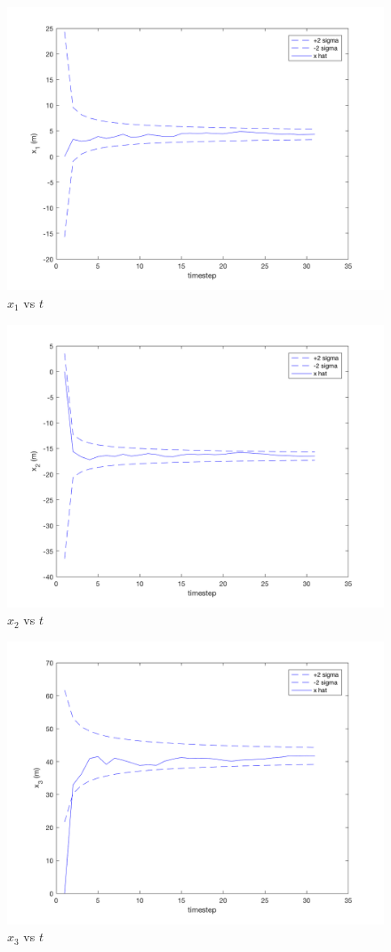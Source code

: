 \documentclass[11pt]{article}
\begin{document}
\subparagraph*{}
\begin{figure}[h!]
	\centering
	\includegraphics[width=0.8\linewidth]{p4_plot1.png}
	\caption{$x_1$ vs $t$}
	\label{p4_plot1}
\end{figure}
\begin{figure}[h!]
	\centering
	\includegraphics[width=0.8\linewidth]{p4_plot2.png}
	\caption{$x_2$ vs $t$}
	\label{p4_plot2}
\end{figure}
\begin{figure}[h!]
	\centering
	\includegraphics[width=0.8\linewidth]{p4_plot3.png}
	\caption{$x_3$ vs $t$}
	\label{p3_plot1}
\end{figure}
\end{document}
